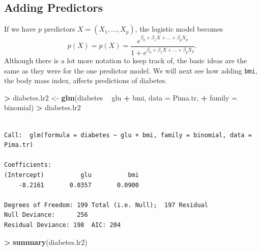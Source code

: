 \documentclass[]{krantz}
\makeatletter
\newenvironment{Shaded}{\begin{snugshade}}{\end{snugshade}}
\newcommand{\DataTypeTok}[1]{\textcolor[rgb]{0.27,0.27,0.27}{#1}}
\newcommand{\KeywordTok}[1]{\textcolor[rgb]{0.27,0.27,0.27}{\textbf{#1}}}
\newcommand{\NormalTok}[1]{#1}
\newcommand{\OperatorTok}[1]{\textcolor[rgb]{0.43,0.43,0.43}{\textbf{#1}}}
\newcommand{\StringTok}[1]{\textcolor[rgb]{0.5,0.5,0.5}{#1}}
\newenvironment{kframe}{%
\medskip{}
\setlength{\fboxsep}{.8em}
 \def\at@end@of@kframe{}%
 \ifinner\ifhmode%
  \def\at@end@of@kframe{\end{minipage}}%
  \begin{minipage}{\columnwidth}%
 \fi\fi%
 \def\FrameCommand##1{\hskip\@totalleftmargin \hskip-\fboxsep
 \colorbox{shadecolor}{##1}\hskip-\fboxsep
     \hskip-\linewidth \hskip-\@totalleftmargin \hskip\columnwidth}%
 \MakeFramed {\advance\hsize-\width
   \@totalleftmargin\z@ \linewidth\hsize
   \@setminipage}}%
 {\par\unskip\endMakeFramed%
 \at@end@of@kframe}
\renewenvironment{Shaded}{\begin{kframe}}{\end{kframe}}
\makeatother
\begin{document}
\hypertarget{adding-predictors}{%
\subsection{Adding Predictors}\label{adding-predictors}}

If we have \(p\) predictors \(X = (X_1, \dots, X_p)\), the logistic model becomes
\[
p(X) = p(X) = \frac{e^{\beta_0 + \beta_1 X + \dots + \beta_p X_p}}{1 + e^{\beta_0 + \beta_1 X + \dots + \beta_p X_p}}.
\]
Although there is a lot more notation to keep track of, the basic ideas are the same as they were for the one predictor model. We will next see how adding \texttt{bmi}, the body mass index, affects predictions of diabetes.

\begin{Shaded}
\begin{Highlighting}[]
\OperatorTok{>}\StringTok{ }\NormalTok{diabetes.lr2 <-}\StringTok{ }\KeywordTok{glm}\NormalTok{(diabetes }\OperatorTok{~}\StringTok{ }\NormalTok{glu }\OperatorTok{+}\StringTok{ }\NormalTok{bmi, }\DataTypeTok{data =}\NormalTok{ Pima.tr, }
\OperatorTok{+}\StringTok{   }\DataTypeTok{family =}\NormalTok{ binomial)}
\OperatorTok{>}\StringTok{ }\NormalTok{diabetes.lr2}
\end{Highlighting}
\end{Shaded}

\begin{verbatim}

Call:  glm(formula = diabetes ~ glu + bmi, family = binomial, data = Pima.tr)

Coefficients:
(Intercept)          glu          bmi  
    -8.2161       0.0357       0.0900  

Degrees of Freedom: 199 Total (i.e. Null);  197 Residual
Null Deviance:      256 
Residual Deviance: 198  AIC: 204
\end{verbatim}

\begin{Shaded}
\begin{Highlighting}[]
\OperatorTok{>}\StringTok{ }\KeywordTok{summary}\NormalTok{(diabetes.lr2)}
\end{Highlighting}
\end{Shaded}
\end{document}
